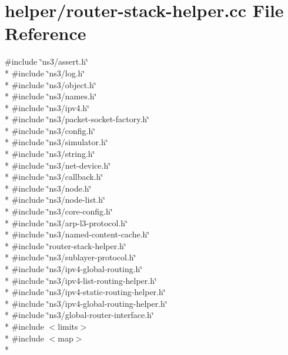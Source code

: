 \hypertarget{router-stack-helper_8cc}{\section{helper/router-\/stack-\/helper.cc File Reference}
\label{router-stack-helper_8cc}
}
{\ttfamily \#include \char`\"{}ns3/assert.\-h\char`\"{}}\\*
{\ttfamily \#include \char`\"{}ns3/log.\-h\char`\"{}}\\*
{\ttfamily \#include \char`\"{}ns3/object.\-h\char`\"{}}\\*
{\ttfamily \#include \char`\"{}ns3/names.\-h\char`\"{}}\\*
{\ttfamily \#include \char`\"{}ns3/ipv4.\-h\char`\"{}}\\*
{\ttfamily \#include \char`\"{}ns3/packet-\/socket-\/factory.\-h\char`\"{}}\\*
{\ttfamily \#include \char`\"{}ns3/config.\-h\char`\"{}}\\*
{\ttfamily \#include \char`\"{}ns3/simulator.\-h\char`\"{}}\\*
{\ttfamily \#include \char`\"{}ns3/string.\-h\char`\"{}}\\*
{\ttfamily \#include \char`\"{}ns3/net-\/device.\-h\char`\"{}}\\*
{\ttfamily \#include \char`\"{}ns3/callback.\-h\char`\"{}}\\*
{\ttfamily \#include \char`\"{}ns3/node.\-h\char`\"{}}\\*
{\ttfamily \#include \char`\"{}ns3/node-\/list.\-h\char`\"{}}\\*
{\ttfamily \#include \char`\"{}ns3/core-\/config.\-h\char`\"{}}\\*
{\ttfamily \#include \char`\"{}ns3/arp-\/l3-\/protocol.\-h\char`\"{}}\\*
{\ttfamily \#include \char`\"{}ns3/named-\/content-\/cache.\-h\char`\"{}}\\*
{\ttfamily \#include \char`\"{}router-\/stack-\/helper.\-h\char`\"{}}\\*
{\ttfamily \#include \char`\"{}ns3/sublayer-\/protocol.\-h\char`\"{}}\\*
{\ttfamily \#include \char`\"{}ns3/ipv4-\/global-\/routing.\-h\char`\"{}}\\*
{\ttfamily \#include \char`\"{}ns3/ipv4-\/list-\/routing-\/helper.\-h\char`\"{}}\\*
{\ttfamily \#include \char`\"{}ns3/ipv4-\/static-\/routing-\/helper.\-h\char`\"{}}\\*
{\ttfamily \#include \char`\"{}ns3/ipv4-\/global-\/routing-\/helper.\-h\char`\"{}}\\*
{\ttfamily \#include \char`\"{}ns3/global-\/router-\/interface.\-h\char`\"{}}\\*
{\ttfamily \#include $<$limits$>$}\\*
{\ttfamily \#include $<$map$>$}\\*
